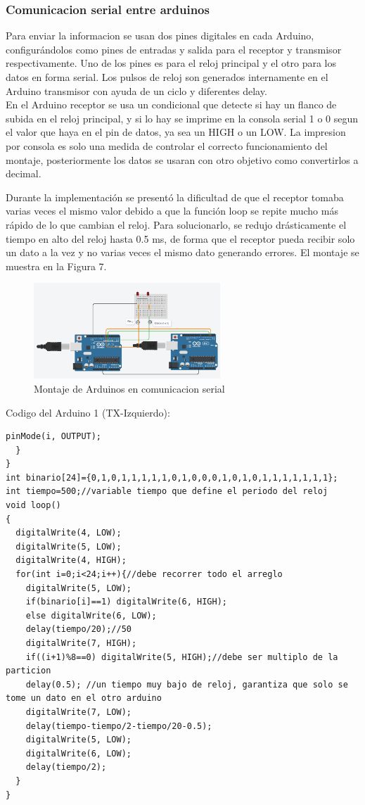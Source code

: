 \documentclass{article}
\begin{document}
\subsubsection{Comunicacion serial entre arduinos}
Para enviar la informacion se usan dos pines digitales en cada Arduino, configurándolos como pines de entradas y salida para el receptor y transmisor respectivamente. Uno de los pines es para el reloj principal y el otro para los datos en forma serial. Los pulsos de reloj son generados internamente en el Arduino transmisor con ayuda de un ciclo y diferentes delay.\\

En el Arduino receptor se usa un condicional que detecte si hay un flanco de subida en el reloj principal, y si lo hay se imprime en la consola serial 1 o 0 segun el valor que haya en el pin de datos, ya sea un HIGH o un LOW. La impresion por consola es solo una medida de controlar el correcto funcionamiento del montaje, posteriormente los datos se usaran con otro objetivo como convertirlos a decimal.

Durante la implementación se presentó la dificultad de que el receptor tomaba varias veces el mismo valor debido a que la función loop se repite mucho más rápido de lo que cambian el reloj. Para solucionarlo, se redujo drásticamente el tiempo en alto del reloj hasta 0.5 ms, de forma que el receptor pueda recibir solo un dato a la vez y no varias veces el mismo dato generando errores. El montaje se muestra en la Figura 7.

\begin{figure}[!ht] 
\includegraphics[width=7cm]{montajeSerial.PNG}
\centering
\caption{Montaje de Arduinos en comunicacion serial}
\end{figure}

\noindent
Codigo del Arduino 1 (TX-Izquierdo):

\begin{lstlisting}[style=C++]
  	pinMode(i, OUTPUT);
  }  
}
int binario[24]={0,1,0,1,1,1,1,1,0,1,0,0,0,1,0,1,0,1,1,1,1,1,1,1};
int tiempo=500;//variable tiempo que define el periodo del reloj
void loop()
{
  digitalWrite(4, LOW);
  digitalWrite(5, LOW);
  digitalWrite(4, HIGH);
  for(int i=0;i<24;i++){//debe recorrer todo el arreglo
    digitalWrite(5, LOW);
    if(binario[i]==1) digitalWrite(6, HIGH);
    else digitalWrite(6, LOW);
    delay(tiempo/20);//50
    digitalWrite(7, HIGH);
    if((i+1)%8==0) digitalWrite(5, HIGH);//debe ser multiplo de la particion
    delay(0.5); //un tiempo muy bajo de reloj, garantiza que solo se tome un dato en el otro arduino
    digitalWrite(7, LOW);
    delay(tiempo-tiempo/2-tiempo/20-0.5);
    digitalWrite(5, LOW);
    digitalWrite(6, LOW);
    delay(tiempo/2); 
  }
}
\end{lstlisting}
\end{document}
